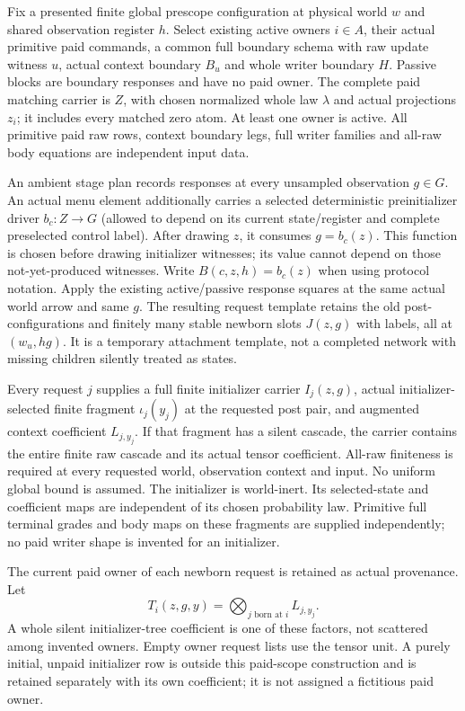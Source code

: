 \documentclass[11pt]{article}
\begin{document}
Fix a presented finite global prescope configuration at physical world $w$ and shared observation register $h$. Select existing active owners $i\in A$, their actual primitive paid commands, a common full boundary schema with raw update witness $u$, actual context boundary $B_u$ and whole writer boundary $H$. Passive blocks are boundary responses and have no paid owner. The complete paid matching carrier is $Z$, with chosen normalized whole law $\lambda$ and actual projections $z_i$; it includes every matched zero atom. At least one owner is active. All primitive paid raw rows, context boundary legs, full writer families and all-raw body equations are independent input data.

An ambient stage plan records responses at every unsampled observation $g\in G$. An actual menu element additionally carries a selected deterministic preinitializer driver $b_c:Z\to G$ (allowed to depend on its current state/register and complete preselected control label). After drawing $z$, it consumes $g=b_c(z)$. This function is chosen before drawing initializer witnesses; its value cannot depend on those not-yet-produced witnesses. Write $B(c,z,h)=b_c(z)$ when using protocol notation. Apply the existing active/passive response squares at the same actual world arrow and same $g$. The resulting request template retains the old post-configurations and finitely many stable newborn slots $J(z,g)$ with labels, all at $(w_u,hg)$. It is a temporary attachment template, not a completed network with missing children silently treated as states.

Every request $j$ supplies a full finite initializer carrier $I_j(z,g)$, actual initializer-selected finite fragment $\iota_j(y_j)$ at the requested post pair, and augmented context coefficient $L_{j,y_j}$. If that fragment has a silent cascade, the carrier contains the entire finite raw cascade and its actual tensor coefficient. All-raw finiteness is required at every requested world, observation context and input. No uniform global bound is assumed. The initializer is world-inert. Its selected-state and coefficient maps are independent of its chosen probability law. Primitive full terminal grades and body maps on these fragments are supplied independently; no paid writer shape is invented for an initializer.

The current paid owner of each newborn request is retained as actual provenance. Let
\[
        T_i(z,g,y)=\bigotimes_{j\text{ born at }i}L_{j,y_j}. \tag{1}
\]
A whole silent initializer-tree coefficient is one of these factors, not scattered among invented owners. Empty owner request lists use the tensor unit. A purely initial, unpaid initializer row is outside this paid-scope construction and is retained separately with its own coefficient; it is not assigned a fictitious paid owner.
\end{document}
